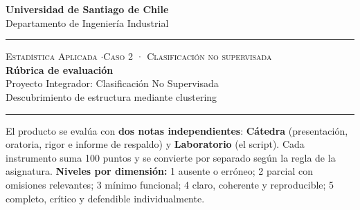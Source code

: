 \documentclass[11pt,letterpaper]{article}
\newcommand{\hrulethin}{\noindent\rule{\textwidth}{0.6pt}}
\begin{document}
\pagestyle{plain}
\begin{center}
    \textbf{\large Universidad de Santiago de Chile}\\[0.1cm]
    Departamento de Ingeniería Industrial
\end{center}
\vspace{0.15cm}\hrulethin\vspace{0.35cm}
\begin{center}
    {\scshape Estadística Aplicada \quad$\cdot$\quad Caso 2 · Clasificación no supervisada}\\[0.35cm]
    {\LARGE \textbf{Rúbrica de evaluación}}\\[0.15cm]
    {\large Proyecto Integrador: Clasificación No Supervisada}\\[0.2cm]
    Descubrimiento de estructura mediante clustering
\end{center}
\vspace{0.2cm}\hrulethin\vspace{0.4cm}
El producto se evalúa con \textbf{dos notas independientes}: \textbf{Cátedra} (presentación, oratoria, rigor e informe de respaldo) y \textbf{Laboratorio} (el script). Cada instrumento suma 100 puntos y se convierte por separado según la regla de la asignatura. \textbf{Niveles por dimensión:} 1 ausente o erróneo; 2 parcial con omisiones relevantes; 3 mínimo funcional;
4 claro, coherente y reproducible; 5 completo, crítico y defendible individualmente.
\end{document}
